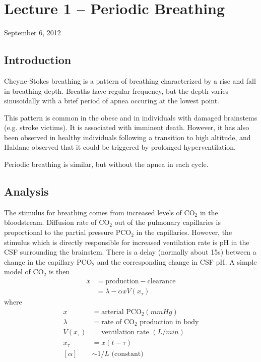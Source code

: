 \section{Lecture 1 -- Periodic Breathing}
September 6, 2012

\subsection{Introduction}

Cheyne-Stokes breathing is a pattern of breathing characterized by a rise and fall in breathing depth. Breaths have regular frequency, but the depth varies sinusoidally with a brief period of apnea occuring at the lowest point.

This pattern is common in the obese and in individuals with damaged brainstems (e.g. stroke victims). It is associated with imminent death. However, it has also been observed in healthy individuals following a transition to high altitude, and Haldane observed that it could be triggered by prolonged hyperventilation.

Periodic breathing is similar, but without the apnea in each cycle.

\subsection{Analysis}

The stimulus for breathing comes from increased levels of $\mathrm{CO}_2$ in the bloodstream. Diffusion rate of $\mathrm{CO}_2$ out of the pulmonary capillaries is proportional to the partial pressure $\mathrm{PCO}_2$ in the capillaries. However, the stimulus which is directly responsible for increased ventilation rate is pH in the CSF surrounding the brainstem. There is a delay (normally about 15s) between a change in the capillary $\mathrm{PCO}_2$ and the corresponding change in CSF pH. A simple model of $\mathrm{CO}_2$ is then 
\begin{align}
  \dot{x} &=\text{production}-\text{clearance}\nonumber \\ &= \lambda - \alpha xV(x_\tau)
  \label{eq:xdot}
\end{align}
where
\begin{align*}
  x &= \text{arterial PCO}_2 (mmHg)\\
  \lambda &= \text{rate of CO}_2\text{ production in body}\\
  V(x_\tau) &= \text{ventilation rate }(L/min)\\
  x_\tau &= x(t-\tau)\\
  [\alpha] &\sim 1/L \text{ (constant)}
\end{align*}


